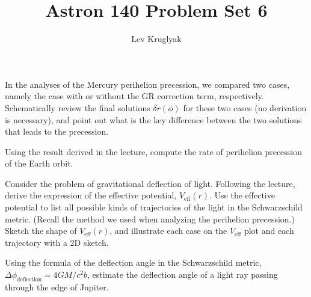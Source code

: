 \documentclass{../../templates/lkx_pset}
\title{Astron 140 Problem Set 6}
\author{Lev Kruglyak}
\begin{document}
\maketitle

\begin{problem}{1}
In the analyses of the Mercury perihelion precession, we compared two cases, namely the case with or without the GR correction term, respectively. Schematically review the final solutions $\delta r(\phi)$ for these two cases (no derivation is necessary), and point out what is the key difference between the two solutions that leads to the precession.
\end{problem}


\begin{problem}{2}
Using the result derived in the lecture, compute the rate of perihelion precession of the Earth orbit.
\end{problem}

\begin{problem}{3}
Consider the problem of gravitational deflection of light. Following the lecture, derive the expression of the effective potential, $V_{\text{eff}}(r)$. Use the effective potential to list all possible kinds of trajectories of the light in the Schwarzschild metric. (Recall the method we used when analyzing the perihelion precession.) Sketch the shape of $V_{\text{eff}}(r)$, and illustrate each case on the $V_{\text{eff}}$ plot and each trajectory with a 2D sketch.
\end{problem}

\begin{problem}{4}
Using the formula of the deflection angle in the Schwarzschild metric, $\Delta \phi_{\text{deflection}} = 4GM/c^2 b$, estimate the deflection angle of a light ray passing through the edge of Jupiter.
\end{problem}
\end{document}
